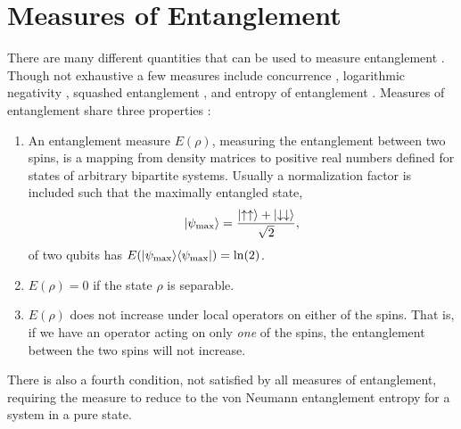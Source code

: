 \section{Measures of Entanglement}

There are many different quantities that can be used to measure entanglement . Though not exhaustive a few measures include concurrence \cite{concurrence}, logarithmic negativity \cite{negativity}, squashed entanglement \cite{squashed}, and entropy of entanglement \cite{EE}.
Measures of entanglement share three properties \cite{Plenio2005}:
\begin{enumerate}
\item An entanglement measure $E(\rho)$, measuring the entanglement between two spins, is a mapping from density matrices to positive real numbers defined for states of arbitrary bipartite systems.
Usually a normalization factor is included such that the maximally entangled state,
\begin{equation}
\lvert {\psi_{\rm max}} \rangle  = \frac{\lvert {\uparrow\uparrow} \rangle + \lvert {\downarrow\downarrow} \rangle}{\sqrt{2}},
\end{equation}
 of two qubits has $E(\lvert {\psi_{\rm max}} \rangle\langle {\psi_{\rm max}} \rvert) = \ln(2)$.
 \item  $E(\rho)=0$ if the state $\rho$ is separable.
 \item $E(\rho)$ does not increase under local operators on either of the spins.  That is, if we have an operator acting on only {\it one} of the spins, the entanglement between the two spins will not increase.
\end{enumerate}
There is also a fourth condition, not satisfied by all measures of entanglement, requiring the measure to reduce to the von Neumann entanglement entropy for a system in a pure state.


